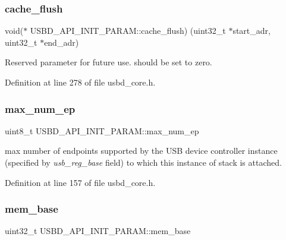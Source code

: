 \subsubsection{\texorpdfstring{cache\+\_\+flush}{cache\_flush}}
{\footnotesize\ttfamily void($\ast$  U\+S\+B\+D\+\_\+\+A\+P\+I\+\_\+\+I\+N\+I\+T\+\_\+\+P\+A\+R\+A\+M\+::cache\+\_\+flush) (uint32\+\_\+t $\ast$start\+\_\+adr, uint32\+\_\+t $\ast$end\+\_\+adr)}

Reserved parameter for future use. should be set to zero. 

Definition at line 278 of file usbd\+\_\+core.\+h.

\mbox{\label{struct_u_s_b_d___a_p_i___i_n_i_t___p_a_r_a_m_a168996cbd91b47939fe823bf0bf7cbe0}} 
\subsubsection{\texorpdfstring{max\+\_\+num\+\_\+ep}{max\_num\_ep}}
{\footnotesize\ttfamily uint8\+\_\+t U\+S\+B\+D\+\_\+\+A\+P\+I\+\_\+\+I\+N\+I\+T\+\_\+\+P\+A\+R\+A\+M\+::max\+\_\+num\+\_\+ep}

max number of endpoints supported by the U\+SB device controller instance (specified by {\itshape usb\+\_\+reg\+\_\+base} field) to which this instance of stack is attached. 

Definition at line 157 of file usbd\+\_\+core.\+h.

\mbox{\label{struct_u_s_b_d___a_p_i___i_n_i_t___p_a_r_a_m_ac3209246722c2395c476c82d0e76c879}} 
\subsubsection{\texorpdfstring{mem\+\_\+base}{mem\_base}}
{\footnotesize\ttfamily uint32\+\_\+t U\+S\+B\+D\+\_\+\+A\+P\+I\+\_\+\+I\+N\+I\+T\+\_\+\+P\+A\+R\+A\+M\+::mem\+\_\+base}

